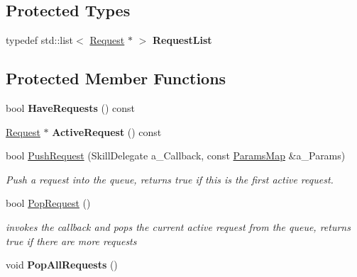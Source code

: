 \subsection*{Protected Types}
\begin{DoxyCompactItemize}
\item 
\mbox{\label{class_i_skill_a6bf41210a021139a1e001108581917e3}} 
typedef std\+::list$<$ \hyperlink{struct_i_skill_1_1_request}{Request} $\ast$ $>$ {\bfseries Request\+List}
\end{DoxyCompactItemize}
\subsection*{Protected Member Functions}
\begin{DoxyCompactItemize}
\item 
\mbox{\label{class_i_skill_a68cb01da21e254114ee4dde1a5a19fd8}} 
bool {\bfseries Have\+Requests} () const
\item 
\mbox{\label{class_i_skill_a4daf4ea4b3326ac134d13231173af641}} 
\hyperlink{struct_i_skill_1_1_request}{Request} $\ast$ {\bfseries Active\+Request} () const
\item 
\mbox{\label{class_i_skill_af9487c5d673cc9dc6d26714291d23e5d}} 
bool \hyperlink{class_i_skill_af9487c5d673cc9dc6d26714291d23e5d}{Push\+Request} (Skill\+Delegate a\+\_\+\+Callback, const \hyperlink{class_params_map}{Params\+Map} \&a\+\_\+\+Params)
\begin{DoxyCompactList}\small\item\em Push a request into the queue, returns true if this is the first active request. \end{DoxyCompactList}\item 
\mbox{\label{class_i_skill_ad157dbcb7747d66fb0f282e87d289875}} 
bool \hyperlink{class_i_skill_ad157dbcb7747d66fb0f282e87d289875}{Pop\+Request} ()
\begin{DoxyCompactList}\small\item\em invokes the callback and pops the current active request from the queue, returns true if there are more requests \end{DoxyCompactList}\item 
\mbox{\label{class_i_skill_a02ee7862bb7a20cb954a94333ab2e394}} 
void {\bfseries Pop\+All\+Requests} ()
\end{DoxyCompactItemize}
